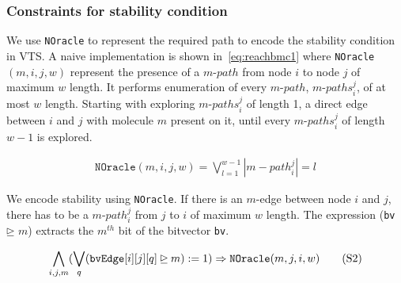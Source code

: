 \subsubsection{Constraints for stability condition}
%
We use \texttt{NOracle} to represent the required path to encode the stability condition in VTS.
%
A naive implementation is shown in~\ref{eq:reachbmc1} where \texttt{NOracle}$(m, i, j, w)$ represent the presence of a $m$-$path$ from node $i$ to node $j$ of maximum $w$ length.
%
%
It performs enumeration of every $m$-$path$, $m$-${paths}_i^j$, of at most $w$ length. 
%
Starting with exploring $m$-${paths}_i^j$ of length 1, a direct edge between $i$ and $j$ with molecule $m$ present on it, until every $m$-${paths}_i^j$ of length $w-1$ is explored.


\begin{align}
\texttt{NOracle}(m, i, j, w) = \bigvee\limits_{l = 1}^{w-1} | {m-path}_i^j | = l
  \tag{S1}\label{eq:reachbmc1}
\end{align}

We encode stability using \texttt{NOracle}. If there is an $m$-edge between node $i$ and $j$, there has to be a $m$-$path_i^j$ from $j$ to $i$ of maximum $w$ length.
%
The expression (\texttt{bv} $\unrhd$ $m$) extracts the $m^{th}$ bit of the bitvector \texttt{bv}. 

\begin{align}
	\bigwedge\limits_{i,j,m} (\bigvee_{q} (\texttt{bvEdge}[i][j][q] \unrhd m) := 1) \Rightarrow \texttt{NOracle}(m, j, i, w)
  \tag{S2}\label{eq:reachbmc2}
\end{align}

